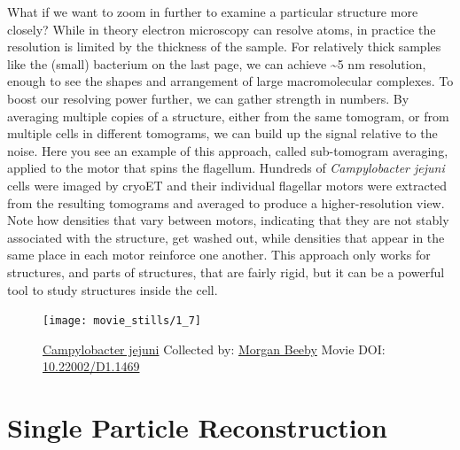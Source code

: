 \documentclass[]{tufte-book}
\begin{document}
What if we want to zoom in further to examine a particular structure
more closely? While in theory electron microscopy can resolve atoms, in
practice the resolution is limited by the thickness of the sample. For
relatively thick samples like the (small) bacterium on the last page, we
can achieve \textasciitilde{}5 nm resolution, enough to see the shapes
and arrangement of large macromolecular complexes. To boost our
resolving power further, we can gather strength in numbers. By averaging
multiple copies of a structure, either from the same tomogram, or from
multiple cells in different tomograms, we can build up the signal
relative to the noise. Here you see an example of this approach, called
sub-tomogram averaging, applied to the motor that spins the flagellum.
Hundreds of \emph{Campylobacter jejuni} cells were imaged by cryoET and
their individual flagellar motors were extracted from the resulting
tomograms and averaged to produce a higher-resolution view. Note how
densities that vary between motors, indicating that they are not stably
associated with the structure, get washed out, while densities that
appear in the same place in each motor reinforce one another. This
approach only works for structures, and parts of structures, that are
fairly rigid, but it can be a powerful tool to study structures inside
the cell.





\begin{figure}
\texttt{[image: movie\_stills/1\_7]} \caption[\protect\hyperlink{tree}{Campylobacter jejuni} Collected by:
\protect\hyperlink{morgan_beeby}{Morgan Beeby} Movie DOI:
\href{https://doi.org/10.22002/D1.1469}{10.22002/D1.1469}]{\protect\hyperlink{tree}{Campylobacter jejuni} Collected by:
\protect\hyperlink{morgan_beeby}{Morgan Beeby} Movie DOI:
\href{https://doi.org/10.22002/D1.1469}{10.22002/D1.1469}}\label{fig:1-7}
\end{figure}

\section{Single Particle
Reconstruction}\label{single-particle-reconstruction}
\end{document}
